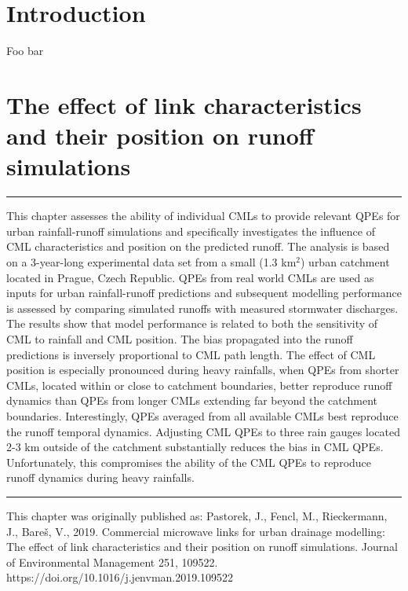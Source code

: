 \documentclass{ctuthesis}\usepackage[]{graphicx}\usepackage[]{color}
\begin{document}
        \maketitle
        
        \chapter{Introduction}
        Foo bar
        
        


\chapter{The effect of link characteristics and their position on runoff simulations} \label{chap2}

\rule{\textwidth}{0.4pt}
This chapter assesses the ability of individual CMLs to provide relevant QPEs for urban rainfall-runoff simulations and specifically investigates the influence of CML characteristics and position on the predicted runoff. The analysis is based on a 3-year-long experimental data set from a small (1.3 km$^2$) urban catchment located in Prague, Czech Republic. QPEs from real world CMLs are used as inputs for urban rainfall-runoff predictions and subsequent modelling performance is assessed by comparing simulated runoffs with measured stormwater discharges. The results show that model performance is related to both the sensitivity of CML to rainfall and CML position. The bias propagated into the runoff predictions is inversely proportional to CML path length. The effect of CML position is especially pronounced during heavy rainfalls, when QPEs from shorter CMLs, located within or close to catchment boundaries, better reproduce runoff dynamics than QPEs from longer CMLs extending far beyond the catchment boundaries. Interestingly, QPEs averaged from all available CMLs best reproduce the runoff temporal dynamics. Adjusting CML QPEs to three rain gauges located 2-3 km outside of the catchment substantially reduces the bias in CML QPEs. Unfortunately, this compromises the ability of the CML QPEs to reproduce runoff dynamics during heavy rainfalls.
\rule[0.2cm]{\textwidth}{0.4pt}

{\footnotesize This chapter was originally published as: \newline
Pastorek, J., Fencl, M., Rieckermann, J., Bareš, V., 2019. Commercial microwave links for urban drainage modelling: The effect of link characteristics and their position on runoff simulations. Journal of Environmental Management 251, 109522. \newline https://doi.org/10.1016/j.jenvman.2019.109522
}
\end{document}
